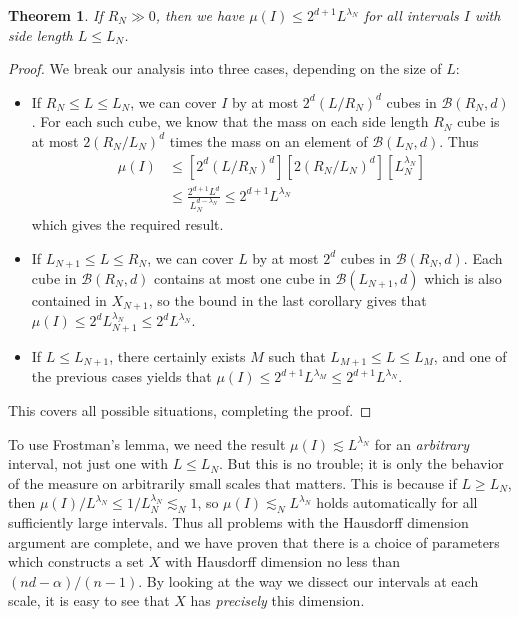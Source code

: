 \documentclass{article}
\theoremstyle{plain}
\theoremstyle{plain}
\newtheorem{theorem}{Theorem}
\begin{document}
\begin{multicols}{2}
\begin{theorem}
	If $R_N \gg 0$, then we have $\mu(I) \leq 2^{d+1} L^{\lambda_N}$ for all intervals $I$ with side length $L \leq L_N$.
\end{theorem}
\begin{proof}
	We break our analysis into three cases, depending on the size of $L$:
	\begin{itemize}
		\item If $R_N \leq L \leq L_N$, we can cover $I$ by at most $2^d(L/R_N)^d$ cubes in $\mathcal{B}(R_N,d)$. For each such cube, we know that the mass on each side length $R_N$ cube is at most $2(R_N/L_N)^d$ times the mass on an element of $\mathcal{B}(L_N,d)$. Thus
		\begin{align*}
			\mu(I) &\leq [2^d(L/R_N)^d] [2(R_N/L_N)^d] [L_N^{\lambda_N}]\\
			&\leq \frac{2^{d+1} L^d}{L_N^{d - \lambda_N}} \leq 2^{d+1} L^{\lambda_N}
		\end{align*}
		which gives the required result.

		\item If $L_{N+1} \leq L \leq R_N$, we can cover $L$ by at most $2^d$ cubes in $\mathcal{B}(R_N,d)$. Each cube in $\mathcal{B}(R_N,d)$ contains at most one cube in $\mathcal{B}(L_{N+1},d)$ which is also contained in $X_{N+1}$, so the bound in the last corollary gives that $\mu(I) \leq 2^d L_{N+1}^{\lambda_N} \leq 2^d L^{\lambda_N}$.

		\item If $L \leq L_{N+1}$, there certainly exists $M$ such that $L_{M+1} \leq L \leq L_M$, and one of the previous cases yields that $\mu(I) \leq 2^{d+1} L^{\lambda_M} \leq 2^{d+1} L^{\lambda_N}$.
	\end{itemize}
	This covers all possible situations, completing the proof.
\end{proof}

To use Frostman's lemma, we need the result $\mu(I) \lesssim L^{\lambda_N}$ for an {\it arbitrary} interval, not just one with $L \leq L_N$. But this is no trouble; it is only the behavior of the measure on arbitrarily small scales that matters. This is because if $L \geq L_N$, then $\mu(I)/L^{\lambda_N} \leq 1/L_N^{\lambda_N} \lesssim_N 1$, so $\mu(I) \lesssim_N L^{\lambda_N}$ holds automatically for all sufficiently large intervals. Thus all problems with the Hausdorff dimension argument are complete, and we have proven that there is a choice of parameters which constructs a set $X$ with Hausdorff dimension no less than $(nd - \alpha)/(n-1)$. By looking at the way we dissect our intervals at each scale, it is easy to see that $X$ has {\it precisely} this dimension.


\end{multicols}
\end{document}
